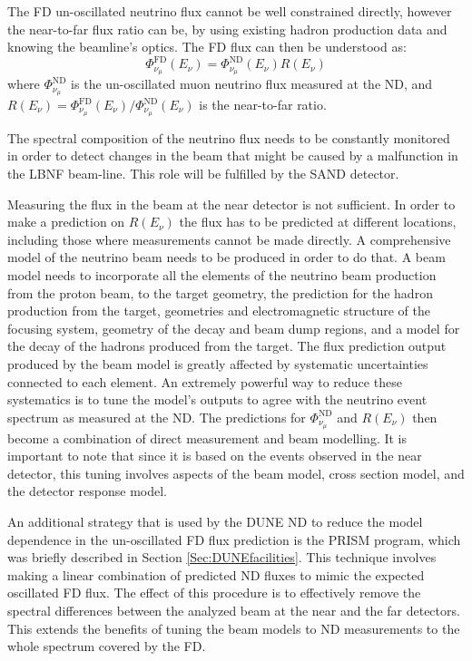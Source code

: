 The FD un-oscillated neutrino flux cannot be well constrained directly, however the near-to-far flux ratio can be, by using existing hadron production data and knowing the beamline's optics. The FD flux can then be understood as:
\begin{equation}
    \Phi^\text{FD}_{\nu_\mu}(E_\nu)=\Phi^\text{ND}_{\nu_\mu}(E_\nu)R(E_\nu)
\end{equation}
where $\Phi^\text{ND}_{\nu_\mu}$ is the un-oscillated muon neutrino flux measured at the ND, and $R(E_\nu)=\Phi^\text{FD}_{\nu_\mu}(E_\nu)/ \Phi^\text{ND}_{\nu_\mu}(E_\nu)$ is the near-to-far ratio. 

The spectral composition of the neutrino flux needs to be constantly monitored in order to detect changes in the beam that might be caused by a malfunction in the LBNF beam-line. This role will be fulfilled by the SAND detector.

Measuring the flux in the beam at the near detector is not sufficient. In order to make a prediction on $R(E_\nu)$ the flux has to be predicted at different locations, including those where measurements cannot be made directly. A comprehensive model of the neutrino beam needs to be produced in order to do that. A beam model needs to incorporate all the elements of the neutrino beam production from the proton beam, to the target geometry, the prediction for the hadron production from the target, geometries and electromagnetic structure of the focusing system, geometry of the decay and beam dump regions, and a model for the decay of the hadrons produced from the target. The flux prediction output produced by the beam model is greatly affected by systematic uncertainties connected to each element. An extremely powerful way to reduce these systematics is to tune the model's outputs to agree with the neutrino event spectrum as measured at the ND. The predictions for $\Phi^\text{ND}_{\nu_\mu}$ and $R(E_\nu)$ then become a combination of direct measurement and beam modelling. It is important to note that since it is based on the events observed in the near detector, this tuning involves aspects of the beam model, cross section model, and the detector response model.

An additional strategy that is used by the DUNE ND to reduce the model dependence in the un-oscillated FD flux prediction is the PRISM program, which was briefly described in Section \ref{Sec:DUNEfacilities}. This technique involves making a linear combination of predicted ND fluxes to mimic the expected oscillated FD flux. The effect of this procedure is to effectively remove the spectral differences between the analyzed beam at the near and the far detectors. This extends the benefits of tuning the beam models to ND measurements to the whole spectrum covered by the FD.


